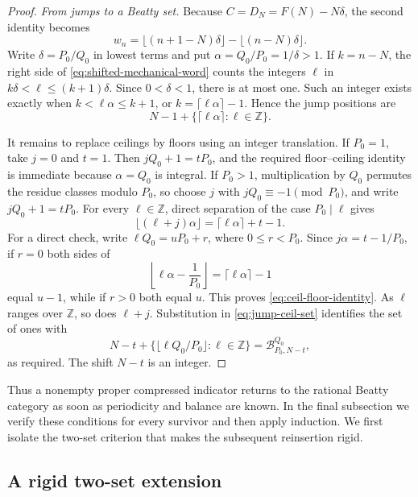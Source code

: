 \documentclass[11pt]{article}
\theoremstyle{definition}
\theoremstyle{remark}
\newcommand{\Z}{\mathbb Z}
\newcommand{\B}{\mathcal B}
\begin{document}
\begin{proof}
\smallskip
\noindent\emph{From jumps to a Beatty set.}
Because \(C=D_N=F(N)-N\delta\), the second identity becomes
\begin{equation}\label{eq:shifted-mechanical-word}
 w_n=\lfloor(n+1-N)\delta\rfloor-
     \lfloor(n-N)\delta\rfloor.
\end{equation}
Write \(\delta=P_0/Q_0\) in lowest terms and put
\(\alpha=Q_0/P_0=1/\delta>1\).  If \(k=n-N\), the right side of
\eqref{eq:shifted-mechanical-word} counts the integers \(\ell\) in
\(k\delta<\ell\le(k+1)\delta\).  Since \(0<\delta<1\), there is at most
one.  Such an integer exists exactly when
\(k<\ell\alpha\le k+1\), or \(k=\lceil\ell\alpha\rceil-1\).  Hence the
jump positions are
\begin{equation}\label{eq:jump-ceil-set}
 N-1+\{\lceil\ell\alpha\rceil:\ell\in\Z\}.
\end{equation}

It remains to replace ceilings by floors using an integer translation.
If \(P_0=1\), take \(j=0\) and \(t=1\).  Then
\(jQ_0+1=tP_0\), and the required floor--ceiling identity is immediate
because \(\alpha=Q_0\) is integral.  If \(P_0>1\), multiplication by
\(Q_0\) permutes the residue classes modulo \(P_0\), so choose \(j\) with
\(jQ_0\equiv-1\pmod{P_0}\), and write \(jQ_0+1=tP_0\).  For every
\(\ell\in\Z\), direct separation of the case \(P_0\mid\ell\) gives
\begin{equation}\label{eq:ceil-floor-identity}
 \lfloor(\ell+j)\alpha\rfloor
 =\lceil\ell\alpha\rceil+t-1.
\end{equation}
For a direct check, write \(\ell Q_0=uP_0+r\), where
\(0\le r<P_0\).  Since \(j\alpha=t-1/P_0\), if \(r=0\) both sides of
\[
 \left\lfloor\ell\alpha-\frac1{P_0}\right\rfloor
 =\lceil\ell\alpha\rceil-1
\]
equal \(u-1\), while if \(r>0\) both equal \(u\).  This proves
\eqref{eq:ceil-floor-identity}.  As \(\ell\) ranges over \(\Z\), so does
\(\ell+j\).  Substitution in \eqref{eq:jump-ceil-set} identifies the set
of ones with
\[
 N-t+\{\lfloor\ell Q_0/P_0\rfloor:\ell\in\Z\}
 =\B^{Q_0}_{P_0,N-t},
\]
as required.  The shift \(N-t\) is an integer.
\end{proof}

Thus a nonempty proper compressed indicator returns to the rational Beatty
category as soon as periodicity and balance are known.  In the final
subsection we verify these conditions for every survivor and then apply
induction.  We first isolate the two-set criterion that makes the subsequent
reinsertion rigid.

\subsection{A rigid two-set extension}
\end{document}
